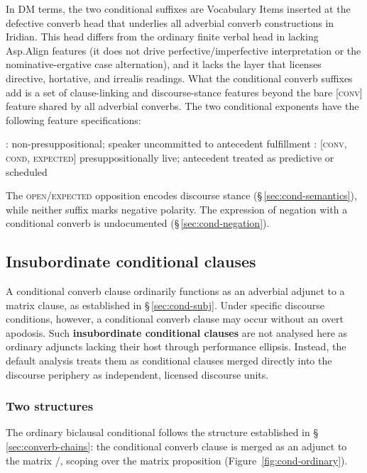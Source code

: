 In DM terms, the two conditional suffixes are Vocabulary Items inserted at the
defective converb head that underlies all adverbial converb constructions in
Iridian. This head differs from the ordinary finite verbal head in lacking
Asp.Align features (it does not drive perfective/imperfective interpretation or
the nominative-ergative case alternation), and it lacks the 
layer that licenses directive, hortative, and irrealis readings. What the
conditional converb suffixes add is a set of clause-linking and discourse-stance
features beyond the bare \textsc{[conv]} feature shared by all adverbial
converbs. The two conditional exponents have the following feature specifications:

\pex
\a {}: 
\hfill non-presuppositional; speaker uncommitted to antecedent fulfillment
\a {}: [\textsc{conv}, \textsc{cond}, \textsc{expected}]
\hfill presuppositionally live; antecedent treated as predictive or scheduled
\xe

The \textsc{open}/\textsc{expected} opposition encodes discourse stance
(§\,\ref{sec:cond-semantics}), while neither suffix marks negative polarity.
The expression of negation with a conditional converb is undocumented
(§\,\ref{sec:cond-negation}).

\subsection{Insubordinate conditional clauses}\label{sec:cond-insub}

A conditional converb clause ordinarily functions as an adverbial adjunct to a
matrix clause, as established in §\,\ref{sec:cond-subj}. Under specific
discourse conditions, however, a conditional converb clause may occur without an
overt apodosis. Such \textbf{insubordinate conditional clauses} are not analysed
here as ordinary adjuncts lacking their host through performance ellipsis.
Instead, the default analysis treats them as conditional clauses merged directly
into the discourse periphery as independent, licensed discourse units.

\subsubsection{Two structures}

The ordinary biclausal conditional follows the structure established in
§\,\ref{sec:converb-chains}: the conditional converb clause is merged as an
adjunct to the matrix /, scoping over the matrix
proposition (Figure~\ref{fig:cond-ordinary}).

